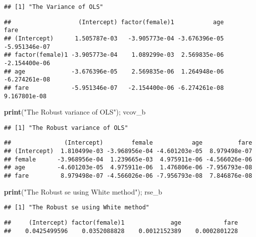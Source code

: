 \documentclass[
  12pt,
]{article}
\newenvironment{Shaded}{\begin{snugshade}}{\end{snugshade}}
\newcommand{\KeywordTok}[1]{\textcolor[rgb]{0.13,0.29,0.53}{\textbf{#1}}}
\newcommand{\NormalTok}[1]{#1}
\newcommand{\StringTok}[1]{\textcolor[rgb]{0.31,0.60,0.02}{#1}}
\begin{document}
\begin{verbatim}
## [1] "The Variance of OLS"
\end{verbatim}

\begin{verbatim}
##                   (Intercept) factor(female)1           age          fare
## (Intercept)      1.505787e-03   -3.905773e-04 -3.676396e-05 -5.951346e-07
## factor(female)1 -3.905773e-04    1.089299e-03  2.569835e-06 -2.154400e-06
## age             -3.676396e-05    2.569835e-06  1.264948e-06 -6.274261e-08
## fare            -5.951346e-07   -2.154400e-06 -6.274261e-08  9.167801e-08
\end{verbatim}

\begin{Shaded}
\begin{Highlighting}[]
\KeywordTok{print}\NormalTok{(}\StringTok{"The Robust variance of OLS"}\NormalTok{); vcov\_b}
\end{Highlighting}
\end{Shaded}

\begin{verbatim}
## [1] "The Robust variance of OLS"
\end{verbatim}

\begin{verbatim}
##               (Intercept)        female           age          fare
## (Intercept)  1.810499e-03 -3.968956e-04 -4.601203e-05  8.979498e-07
## female      -3.968956e-04  1.239665e-03  4.975911e-06 -4.566026e-06
## age         -4.601203e-05  4.975911e-06  1.476806e-06 -7.956793e-08
## fare         8.979498e-07 -4.566026e-06 -7.956793e-08  7.846876e-08
\end{verbatim}

\begin{Shaded}
\begin{Highlighting}[]
\KeywordTok{print}\NormalTok{(}\StringTok{"The Robust se using White method"}\NormalTok{); rse\_b}
\end{Highlighting}
\end{Shaded}

\begin{verbatim}
## [1] "The Robust se using White method"
\end{verbatim}

\begin{verbatim}
##     (Intercept) factor(female)1             age            fare 
##    0.0425499596    0.0352088828    0.0012152389    0.0002801228
\end{verbatim}
\end{document}
